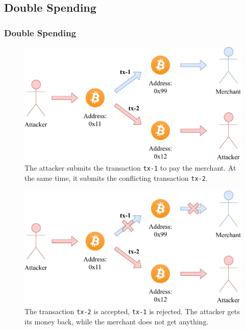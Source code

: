 \documentclass[pdf]{beamer}
\begin{document}
\subsection{Double Spending}
\begin{frame}
	\frametitle{Double Spending}
	\begin{overprint}
		\begin{figure}
			\centering
			\vspace*{0.1cm}
			\includegraphics[width=0.9\columnwidth]{figures/race_attack_2}
			\vspace*{0.2cm}
			\caption{
				The attacker submits the transaction \texttt{tx-1} to pay the merchant.
				At the same time, it submits the conflicting transaction \texttt{tx-2}.
			}
		\end{figure}
		\begin{figure}
			\centering
			\vspace*{0.1cm}
			\includegraphics[width=0.9\columnwidth]{figures/race_attack_3}
			\vspace*{0.2cm}
			\caption{
				The transaction \texttt{tx-2} is accepted, \texttt{tx-1} is rejected.
				The attacker gets its money back, while the merchant does not get anything.
			}
		\end{figure}
	\end{overprint}
\end{frame}
\end{document}

